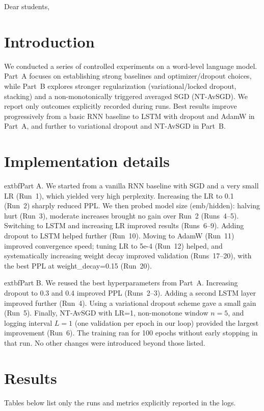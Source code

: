 \documentclass[a4paper]{article}
\begin{document}
\maketitle

Dear students, \\
\section{Introduction}
We conducted a series of controlled experiments on a word-level language model. Part~A focuses on establishing strong baselines and optimizer/dropout choices, while Part~B explores stronger regularization (variational/locked dropout, stacking) and a non-monotonically triggered averaged SGD (NT-AvSGD). We report only outcomes explicitly recorded during runs. Best results improve progressively from a basic RNN baseline to LSTM with dropout and AdamW in Part~A, and further to variational dropout and NT-AvSGD in Part~B.

\section{Implementation details}
	extbf{Part A.} We started from a vanilla RNN baseline with SGD and a very small LR (Run~1), which yielded very high perplexity. Increasing the LR to 0.1 (Run~2) sharply reduced PPL. We then probed model size (emb/hidden): halving hurt (Run~3), moderate increases brought no gain over Run~2 (Runs~4--5). Switching to LSTM and increasing LR improved results (Runs~6--9). Adding dropout to LSTM helped further (Run~10). Moving to AdamW (Run~11) improved convergence speed; tuning LR to 5e-4 (Run~12) helped, and systematically increasing weight decay improved validation (Runs~17--20), with the best PPL at weight\_decay=0.15 (Run~20).

	extbf{Part B.} We reused the best hyperparameters from Part~A. Increasing dropout to 0.3 and 0.4 improved PPL (Runs~2--3). Adding a second LSTM layer improved further (Run~4). Using a variational dropout scheme gave a small gain (Run~5). Finally, NT-AvSGD with LR=1, non-monotone window $n=5$, and logging interval $L=1$ (one validation per epoch in our loop) provided the largest improvement (Run~6). The training ran for 100 epochs without early stopping in that run. No other changes were introduced beyond those listed.

\section{Results}
Tables below list only the runs and metrics explicitly reported in the logs.
\end{document}
